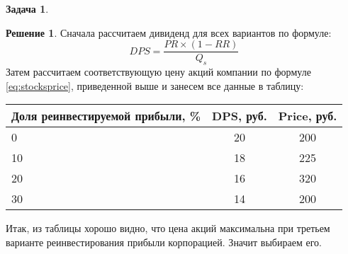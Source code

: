 \documentclass[a4paper, 14pt]{article}
\theoremstyle{plain} %
\theoremstyle{definition} %
\newtheorem*{solution}{Решение}
\newtheorem{problem}{Задача}[subsection]
\theoremstyle{remark} %
\begin{document}
\begin{problem}
\begin{solution}
	Сначала рассчитаем дивиденд для всех вариантов по формуле:
	\[DPS = \frac{PR\times(1-RR)}{Q_{s}}\]
	Затем рассчитаем соответствующую цену акций компании по формуле \eqref{eq:stocksprice}, приведенной выше и занесем все данные в таблицу:
\begin{center}
\begin{tabular}[0.88\textwidth]{|p{4.4cm}|c|c|}
\hline
Доля реинвестируемой прибыли, \% & DPS, руб. & Price, руб.  \\
\hline
0                                & 20  & 200    \\
\hline
10                               & 18  & 225    \\
\hline
20                               & 16  & 320    \\
\hline
30                               & 14  & 200    \\
\hline
\end{tabular}
\end{center}

Итак, из таблицы хорошо видно, что цена акций максимальна при третьем варианте реинвестирования прибыли корпорацией. Значит выбираем его.
\end{solution}
\end{problem}
\end{document}
